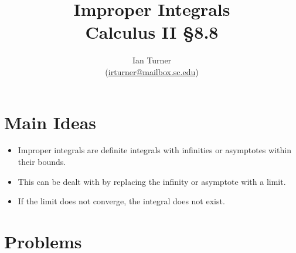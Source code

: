 \documentclass{article}
\begin{document}
\title{
Improper Integrals
\\
\large
Calculus II \S 8.8
} 
\author{
Ian Turner
\\
\small
(\href{mailto:irturner@mailbox.sc.edu}{irturner@mailbox.sc.edu})
}
\maketitle

\section*{Main Ideas}

\begin{itemize}

\item
Improper integrals are definite integrals with infinities or asymptotes within their bounds.

\item
This can be dealt with by replacing the infinity or asymptote with a limit.

\item
If the limit does not converge, the integral does not exist.

\end{itemize}

\section*{Problems}
\end{document}
